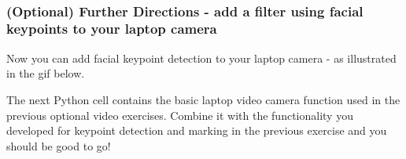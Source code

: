 \documentclass[11pt]{article}
\begin{document}
    \begin{center}
    \end{center}
    { \hspace*{\fill} \\}
    
    \hypertarget{optional-further-directions---add-a-filter-using-facial-keypoints-to-your-laptop-camera}{%
\subsubsection{(Optional) Further Directions - add a filter using facial
keypoints to your laptop
camera}\label{optional-further-directions---add-a-filter-using-facial-keypoints-to-your-laptop-camera}}

Now you can add facial keypoint detection to your laptop camera - as
illustrated in the gif below.

The next Python cell contains the basic laptop video camera function
used in the previous optional video exercises. Combine it with the
functionality you developed for keypoint detection and marking in the
previous exercise and you should be good to go!
\end{document}
